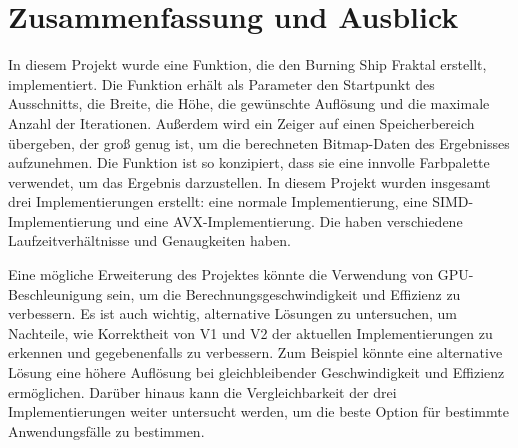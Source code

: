 \documentclass[course=erap]{aspdoc}
\begin{document}
\section{Zusammenfassung und Ausblick}
In diesem Projekt wurde eine Funktion, die den Burning Ship Fraktal erstellt, implementiert. Die Funktion erhält als Parameter den Startpunkt des Ausschnitts, die Breite, die Höhe, die gewünschte Auflösung und die maximale Anzahl der Iterationen. Außerdem wird ein Zeiger auf einen Speicherbereich übergeben, der groß genug ist, um die berechneten Bitmap-Daten des Ergebnisses aufzunehmen. Die Funktion ist so konzipiert, dass sie eine innvolle Farbpalette verwendet, um das Ergebnis darzustellen. In diesem Projekt wurden insgesamt drei Implementierungen erstellt: eine normale Implementierung, eine SIMD-Implementierung und eine AVX-Implementierung. Die haben verschiedene Laufzeitverhältnisse und Genaugkeiten haben.

Eine mögliche Erweiterung des Projektes könnte die Verwendung von GPU-Beschleunigung sein, um die Berechnungsgeschwindigkeit und Effizienz zu verbessern. Es ist auch wichtig, alternative Lösungen zu untersuchen, um Nachteile, wie Korrektheit von V1 und V2 der aktuellen Implementierungen zu erkennen und gegebenenfalls zu verbessern. Zum Beispiel könnte eine alternative Lösung eine höhere Auflösung bei gleichbleibender Geschwindigkeit und Effizienz ermöglichen. Darüber hinaus kann die Vergleichbarkeit der drei Implementierungen weiter untersucht werden, um die beste Option für bestimmte Anwendungsfälle zu bestimmen.


{}
\end{document}

